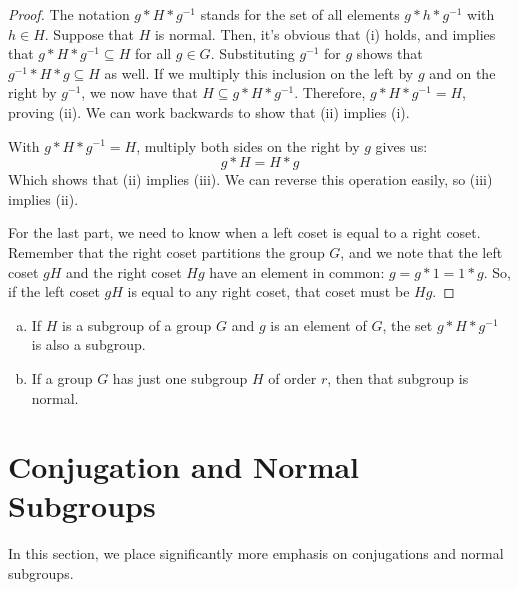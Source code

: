 \documentclass[letterpaper]{article}
\begin{document}
\begin{mdframed}
    \begin{proof}
        The notation $g * H * g^{-1}$ stands for the set of all elements $g * h * g^{-1}$ with $h \in H$. Suppose that $H$ is normal. Then, it's obvious that (i) holds, and implies that $g * H * g^{-1} \subseteq H$ for all $g \in G$. Substituting $g^{-1}$ for $g$ shows that $g^{-1} * H * g \subseteq H$ as well. If we multiply this inclusion on the left by $g$ and on the right by $g^{-1}$, we now have that $H \subseteq g * H * g^{-1}$. Therefore, $g * H * g^{-1} = H$, proving (ii). We can work backwards to show that (ii) implies (i). 

        \bigskip 

        With $g * H * g^{-1} = H$, multiply both sides on the right by $g$ gives us: 
        \[g * H = H * g\]
        Which shows that (ii) implies (iii). We can reverse this operation easily, so (iii) implies (ii).

        \bigskip 

        For the last part, we need to know when a left coset is equal to a right coset. Remember that the right coset partitions the group $G$, and we note that the left coset $gH$ and the right coset $Hg$ have an element in common: $g = g * 1 = 1 * g$. So, if the left coset $gH$ is equal to any right coset, that coset must be $Hg$. 
    \end{proof}
\end{mdframed}

\begin{mdframed}
    \begin{proposition}
        \begin{enumerate}[(a)]
            \item If $H$ is a subgroup of a group $G$ and $g$ is an element of $G$, the set $g * H * g^{-1}$ is also a subgroup. 
            \item If a group $G$ has just one subgroup $H$ of order $r$, then that subgroup is normal. 
        \end{enumerate}
    \end{proposition}
\end{mdframed}












\newpage 
\section{Conjugation and Normal Subgroups}
In this section, we place significantly more emphasis on conjugations and normal subgroups. 
\end{document}
